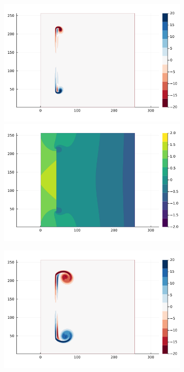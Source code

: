 \documentclass[preprint,12pt]{elsarticle}
\begin{document}
\begin{figure}
    \centering
    \begin{subfigure}{.33\textwidth}
        \centering
         \includegraphics[trim={4cm 7.2cm 5cm 1cm},clip,width=\textwidth]{tex/fig/Disk_biot_omega_1.png}
        \includegraphics[trim={4cm 1.5cm 5cm 7cm},clip,width=\textwidth]{tex/fig/Disk_biot_press_1.png}
    \end{subfigure}%
    \begin{subfigure}{.33\textwidth}
        \centering
        \includegraphics[trim={4cm 7.2cm 5cm 1cm},clip,width=\textwidth]{tex/fig/Disk_biot_omega_2.png}

\end{subfigure}
\end{figure}
\end{document}
